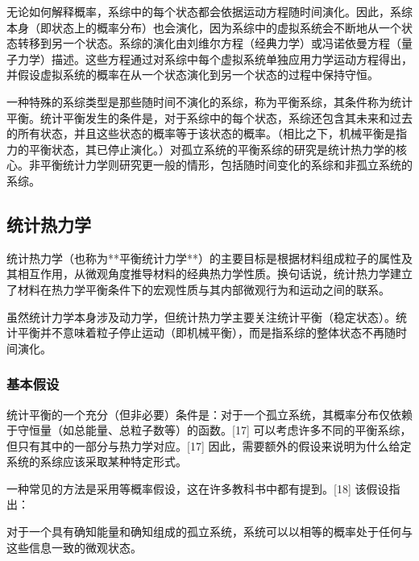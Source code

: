 无论如何解释概率，系综中的每个状态都会依据运动方程随时间演化。因此，系综本身（即状态上的概率分布）也会演化，因为系综中的虚拟系统会不断地从一个状态转移到另一个状态。系综的演化由刘维尔方程（经典力学）或冯诺依曼方程（量子力学）描述。这些方程通过对系综中每个虚拟系统单独应用力学运动方程得出，并假设虚拟系统的概率在从一个状态演化到另一个状态的过程中保持守恒。

一种特殊的系综类型是那些随时间不演化的系综，称为平衡系综，其条件称为统计平衡。统计平衡发生的条件是，对于系综中的每个状态，系综还包含其未来和过去的所有状态，并且这些状态的概率等于该状态的概率。（相比之下，机械平衡是指力的平衡状态，其已停止演化。）对孤立系统的平衡系综的研究是统计热力学的核心。非平衡统计力学则研究更一般的情形，包括随时间变化的系综和非孤立系统的系综。
\subsection{统计热力学} 
统计热力学（也称为**平衡统计力学**）的主要目标是根据材料组成粒子的属性及其相互作用，从微观角度推导材料的经典热力学性质。换句话说，统计热力学建立了材料在热力学平衡条件下的宏观性质与其内部微观行为和运动之间的联系。

虽然统计力学本身涉及动力学，但统计热力学主要关注统计平衡（稳定状态）。统计平衡并不意味着粒子停止运动（即机械平衡），而是指系综的整体状态不再随时间演化。
\subsubsection{基本假设} 
统计平衡的一个充分（但非必要）条件是：对于一个孤立系统，其概率分布仅依赖于守恒量（如总能量、总粒子数等）的函数。[17] 可以考虑许多不同的平衡系综，但只有其中的一部分与热力学对应。[17] 因此，需要额外的假设来说明为什么给定系统的系综应该采取某种特定形式。

一种常见的方法是采用等概率假设，这在许多教科书中都有提到。[18] 该假设指出：

对于一个具有确知能量和确知组成的孤立系统，系统可以以相等的概率处于任何与这些信息一致的微观状态。

